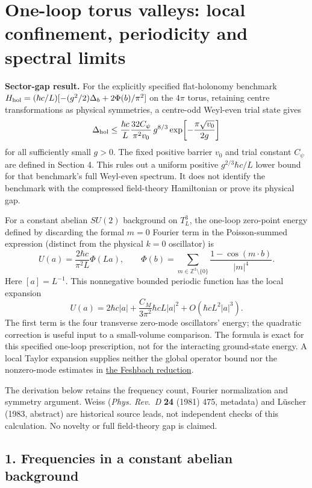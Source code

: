 \documentclass[11pt,a4paper]{article}
\begin{document}
\hypertarget{one-loop-torus-valleys-local-confinement-periodicity-and-spectral-limits}{%
\section{One-loop torus valleys: local confinement, periodicity and
spectral
limits}\label{one-loop-torus-valleys-local-confinement-periodicity-and-spectral-limits}}

\textbf{Sector-gap result.} For the explicitly specified flat-holonomy
benchmark \(H_{\rm hol}=(\hbar c/L)[-(g^2/2)\Delta_b+2\Phi(b)/\pi^2]\)
on the \(4\pi\) torus, retaining centre transformations as physical
symmetries, a centre-odd Weyl-even trial state gives
\[\Delta_{\rm hol}\le\frac{\hbar c}{L}
\frac{32C_\psi}{\pi^2v_0}\,g^{8/3}
\exp\!\left[-\frac{\pi\sqrt{v_0}}{2g}\right]\] for all sufficiently
small \(g>0\). The fixed positive barrier \(v_0\) and trial constant
\(C_\psi\) are defined in Section 4. This rules out a uniform positive
\(g^{2/3}\hbar c/L\) lower bound for that benchmark's full Weyl-even
spectrum. It does not identify the benchmark with the compressed
field-theory Hamiltonian or prove its physical gap.

For a constant abelian \(SU(2)\) background on \(T^3_L\), the one-loop
zero-point energy defined by discarding the formal \(m=0\) Fourier term
in the Poisson-summed expression (distinct from the physical \(k=0\)
oscillator) is \[U(a)=\frac{2\hbar c}{\pi^2L}\Phi(La),\qquad
\Phi(b)=\sum_{m\in\mathbb Z^3\setminus\{0\}}
\frac{1-\cos(m\cdot b)}{|m|^4}.\] Here \([a]=L^{-1}\). This nonnegative
bounded periodic function has the local expansion
\[U(a)=2\hbar c|a|+\frac{C_M}{3\pi^2}\hbar cL|a|^2
+O(\hbar cL^2|a|^3).\] The first term is the four transverse zero-mode
oscillators' energy; the quadratic correction is useful input to a
small-volume comparison. The formula is exact for this specified
one-loop prescription, not for the interacting ground-state energy. A
local Taylor expansion supplies neither the global operator bound nor
the nonzero-mode estimates in
\href{weak-coupling-feshbach-reduction.md}{the Feshbach reduction}.

The derivation below retains the frequency count, Fourier normalization
and symmetry argument. Weiss (\emph{Phys. Rev.~D} \textbf{24} (1981)
475, metadata) and Lüscher (1983, abstract) are historical source leads,
not independent checks of this calculation. No novelty or full
field-theory gap is claimed.

\hypertarget{frequencies-in-a-constant-abelian-background}{%
\subsection{1. Frequencies in a constant abelian
background}\label{frequencies-in-a-constant-abelian-background}}
\end{document}
